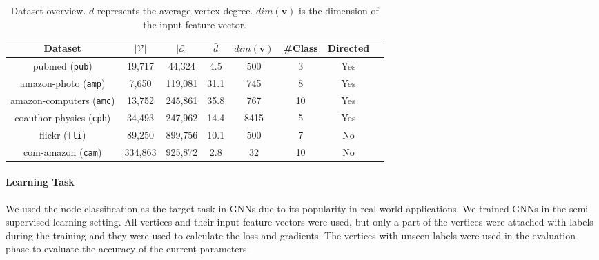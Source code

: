 \begin{table}[H]
    \centering
    \begin{tabular}{cccccccc}
        \toprule
        Dataset                                                 & $|\mathcal{V}|$ & $|\mathcal{E}|$ & $\bar{d}$ & $dim(\boldsymbol{v})$ & \#Class & Directed \\
        \midrule
        pubmed (\texttt{pub}) \cite{yang2016_revisiting_semisupervised}  & 19,717          & 44,324          & 4.5       & 500                   & 3       & Yes      \\
        amazon-photo (\texttt{amp}) \cite{shchur2018_pitfall_of_gnn}     & 7,650           & 119,081         & 31.1      & 745                   & 8       & Yes      \\
        amazon-computers (\texttt{amc}) \cite{shchur2018_pitfall_of_gnn} & 13,752          & 245,861         & 35.8      & 767                   & 10      & Yes      \\
        coauthor-physics (\texttt{cph}) \cite{shchur2018_pitfall_of_gnn} & 34,493          & 247,962         & 14.4      & 8415                  & 5       & Yes      \\
        flickr (\texttt{fli}) \cite{zeng2020_graphsaint}                 & 89,250          & 899,756         & 10.1      & 500                   & 7       & No       \\
        com-amazon (\texttt{cam}) \cite{yang2012_defining}               & 334,863         & 925,872         & 2.8       & 32                    & 10      & No       \\
        \bottomrule
    \end{tabular}
    \caption{Dataset overview. $\bar{d}$ represents the average vertex degree. $dim(\boldsymbol{v})$ is the dimension of the input feature vector.}
    \label{tab:dataset_overview}
\end{table}

\paragraph{Learning Task}
We used the node classification as the target task in GNNs due to its popularity in real-world applications.
We trained GNNs in the semi-supervised learning setting.
All vertices and their input feature vectors were used, but only a part of the vertices were attached with labels during the training and they were used to calculate the loss and gradients.
The vertices with unseen labels were used in the evaluation phase to evaluate the accuracy of the current parameters.

